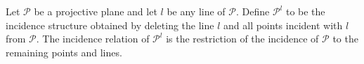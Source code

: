 Let $\mathcal{P}$ be a projective plane and let $l$ be any line of $\mathcal{P}$. Define $\mathcal{P}^l$ to be the incidence structure obtained by deleting the line $l$ and all points incident with $l$ from $\mathcal{P}$. The incidence relation of $\mathcal{P}^l$ is the restriction of the incidence of $\mathcal{P}$ to the remaining points and lines.
